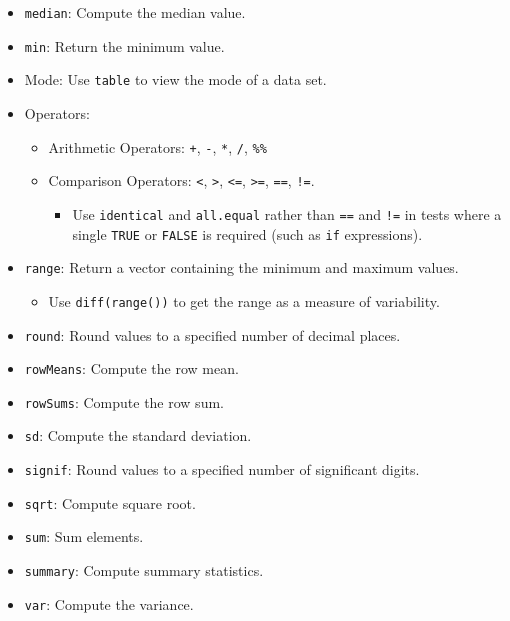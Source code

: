 \documentclass[]{book}
\newenvironment{Shaded}{\begin{snugshade}}{\end{snugshade}}
\newcommand{\DataTypeTok}[1]{\textcolor[rgb]{0.13,0.29,0.53}{#1}}
\newcommand{\DecValTok}[1]{\textcolor[rgb]{0.00,0.00,0.81}{#1}}
\newcommand{\KeywordTok}[1]{\textcolor[rgb]{0.13,0.29,0.53}{\textbf{#1}}}
\newcommand{\NormalTok}[1]{#1}
\newcommand{\OperatorTok}[1]{\textcolor[rgb]{0.81,0.36,0.00}{\textbf{#1}}}
\newcommand{\StringTok}[1]{\textcolor[rgb]{0.31,0.60,0.02}{#1}}
\providecommand{\tightlist}{%
  \setlength{\itemsep}{0pt}\setlength{\parskip}{0pt}}
\begin{document}
\begin{Shaded}
\end{Shaded}

\begin{itemize}
\tightlist
\item
  \texttt{median}: Compute the median value.
\item
  \texttt{min}: Return the minimum value.
\item
  Mode: Use \texttt{table} to view the mode of a data set.
\item
  Operators:

  \begin{itemize}
  \tightlist
  \item
    Arithmetic Operators: \texttt{+}, \texttt{-}, \texttt{*}, \texttt{/}, \texttt{\%\%}
  \item
    Comparison Operators: \texttt{\textless{}}, \texttt{\textgreater{}}, \texttt{\textless{}=}, \texttt{\textgreater{}=}, \texttt{==}, \texttt{!=}.

    \begin{itemize}
    \tightlist
    \item
      Use \texttt{identical} and \texttt{all.equal} rather than \texttt{==} and \texttt{!=} in tests where a single \texttt{TRUE} or \texttt{FALSE} is required (such as \texttt{if} expressions).
    \end{itemize}
  \end{itemize}
\item
  \texttt{range}: Return a vector containing the minimum and maximum values.

  \begin{itemize}
  \tightlist
  \item
    Use \texttt{diff(range())} to get the range as a measure of variability.
  \end{itemize}
\item
  \texttt{round}: Round values to a specified number of decimal places.
\item
  \texttt{rowMeans}: Compute the row mean.
\item
  \texttt{rowSums}: Compute the row sum.
\item
  \texttt{sd}: Compute the standard deviation.
\item
  \texttt{signif}: Round values to a specified number of significant digits.
\item
  \texttt{sqrt}: Compute square root.
\item
  \texttt{sum}: Sum elements.
\item
  \texttt{summary}: Compute summary statistics.
\item
  \texttt{var}: Compute the variance.
\end{itemize}
\end{document}
